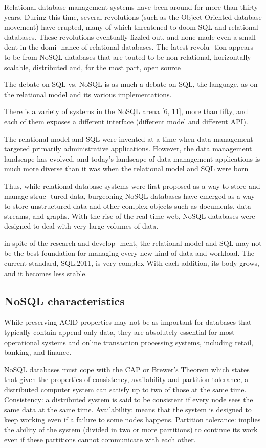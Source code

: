 Relational database management systems have been around for more than thirty years. During this time, several revolutions (such as the Object Oriented database movement) have erupted, many of which threatened to doom SQL and relational databases. These revolutions eventually fizzled out, and none made even a small dent in the domi- nance of relational databases. The latest revolu- tion appears to be from NoSQL databases that are touted to be non-relational, horizontally scalable, distributed and, for the most part, open source

The debate on SQL vs. NoSQL is as much a debate on SQL, the language, as on the relational model and its various implementations.

There is a variety of systems in the NoSQL arena [6, 11], more than fifty, and each of them exposes a different interface (different model and different API).


The relational model and SQL were invented at a time when data management targeted primarily administrative applications. However, the data management landscape has evolved, and today’s landscape of data management applications is much more diverse than it was when the relational model and SQL were born

Thus, while relational database systems were first proposed as a way to store and manage struc- tured data, burgeoning NoSQL databases have emerged as a way to store unstructured data and other complex objects such as documents, data streams, and graphs. With the rise of the real-time web, NoSQL databases were designed to deal with very large volumes of data.

in spite of the research and develop- ment, the relational model and SQL may not be the best foundation for managing every new kind of data and workload.
The current standard, SQL:2011, is very complex With each addition, its body grows, and it becomes less stable.

\subsection{NoSQL characteristics}
While preserving ACID properties may not be as important for databases that typically contain append only data, they are absolutely essential for most operational systems and online transaction processing systems, including retail, banking, and finance.

NoSQL databases must cope with the CAP or Brewer’s Theorem which states that given the properties of consistency, availability and partition tolerance, a distributed computer system can satisfy up to two of those at the same time.
Consistency: a distributed system is said to be consistent if every node sees the same data at the same time.
Availability: means that the system is designed to keep working even if a failure to some nodes happens.
Partition tolerance: implies the ability of the system (divided in two or more partitions) to continue its work even if these partitions cannot communicate with each other.


